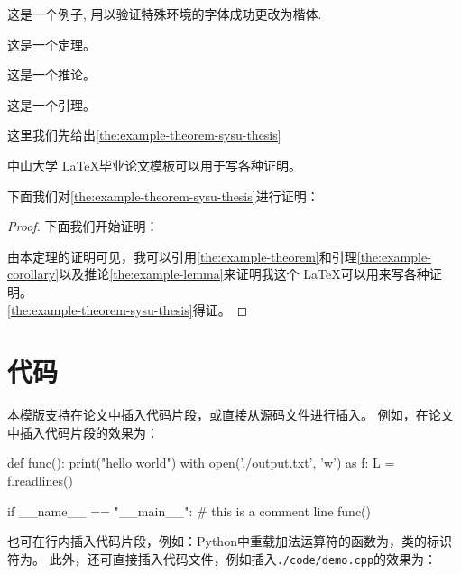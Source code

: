 \begin{eg}
    这是一个例子, 用以验证特殊环境的字体成功更改为楷体.
\end{eg}

\begin{theorem}[定理例子]
    \label{the:example-theorem}
    这是一个定理。
\end{theorem}

\begin{corollary}[推论例子]
    \label{the:example-corollary}
    这是一个推论。
\end{corollary}

\begin{lemma}[引理例子]
    \label{the:example-lemma}
    这是一个引理。
\end{lemma}

这里我们先给出\autoref{the:example-theorem-sysu-thesis}

\begin{theorem}[中山大学毕业论文模板定理]
    \label{the:example-theorem-sysu-thesis}
    中山大学 \LaTeX 毕业论文模板\cite{sysu-thesis}可以用于写各种证明。
\end{theorem}

下面我们对\autoref{the:example-theorem-sysu-thesis}进行证明：


\begin{proof}

    下面我们开始证明：

    由本定理的证明可见，我可以引用\autoref{the:example-theorem}和引理\ref{the:example-corollary}以及推论\ref{the:example-lemma}来证明我这个 \LaTeX 可以用来写各种证明。 \\

    \autoref{the:example-theorem-sysu-thesis}得证。
\end{proof}

\section{代码}

本模版支持在论文中插入代码片段，或直接从源码文件进行插入。
例如，在论文中插入代码片段的效果为：
\begin{python}
    def func():
    print("hello world")
    with open('./output.txt', 'w') as f:
    L = f.readlines()

    if __name__ == "__main__":
    # this is a comment line
    func()
\end{python}
也可在行内插入代码片段，例如：Python中重载加法运算符的函数为，类的标识符为。
此外，还可直接插入代码文件，例如插入\texttt{./code/demo.cpp}的效果为：



